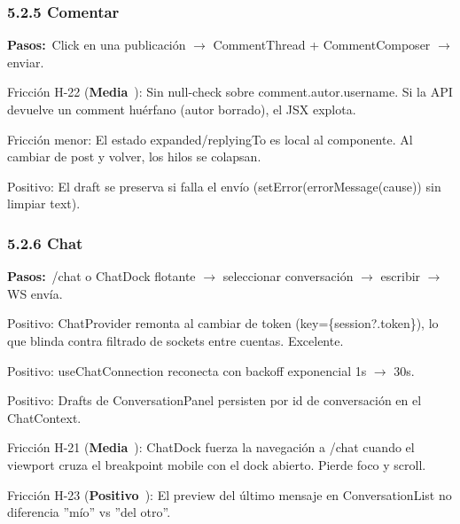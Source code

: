 \documentclass[10pt,a4paper]{article}
\newcommand{\badgeMedia}{\colorbox{yellow!35}{\textcolor{brown!90!black}{\textbf{\footnotesize Media}}}}
\newcommand{\badgePositivo}{\colorbox{green!20}{\textcolor{green!60!black}{\textbf{\footnotesize Positivo}}}}
\begin{document}
\subsubsection{5.2.5 Comentar}
\noindent\textbf{Pasos:}\ Click en una publicación $\rightarrow$ CommentThread + CommentComposer $\rightarrow$ enviar.\par\vspace{0.4em}
Fricción H-22 (\badgeMedia\ ): Sin null-check sobre comment.autor.username. Si la API devuelve un comment huérfano (autor borrado), el JSX explota.\par\vspace{0.4em}
Fricción menor: El estado expanded/replyingTo es local al componente. Al cambiar de post y volver, los hilos se colapsan.\par\vspace{0.4em}
Positivo: El draft se preserva si falla el envío (setError(errorMessage(cause)) sin limpiar text).\par\vspace{0.4em}
\subsubsection{5.2.6 Chat}
\noindent\textbf{Pasos:}\ /chat o ChatDock flotante $\rightarrow$ seleccionar conversación $\rightarrow$ escribir $\rightarrow$ WS envía.\par\vspace{0.4em}
Positivo: ChatProvider remonta al cambiar de token (key=\{session?.token\}), lo que blinda contra filtrado de sockets entre cuentas. Excelente.\par\vspace{0.4em}
Positivo: useChatConnection reconecta con backoff exponencial 1s $\rightarrow$ 30s.\par\vspace{0.4em}
Positivo: Drafts de ConversationPanel persisten por id de conversación en el ChatContext.\par\vspace{0.4em}
Fricción H-21 (\badgeMedia\ ): ChatDock fuerza la navegación a /chat cuando el viewport cruza el breakpoint mobile con el dock abierto. Pierde foco y scroll.\par\vspace{0.4em}
Fricción H-23 (\badgePositivo\ ): El preview del último mensaje en ConversationList no diferencia ''mío'' vs ''del otro''.\par\vspace{0.4em}
\end{document}
